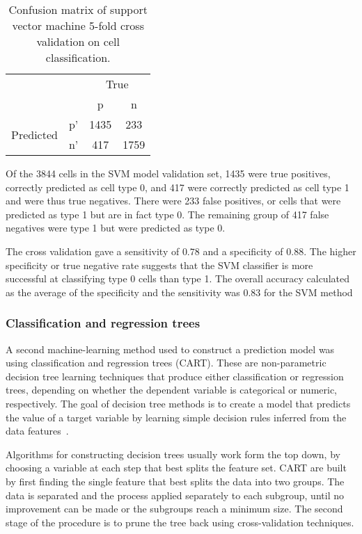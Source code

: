 \begin{table}[htbp]
\caption[Confusion matrix of SVM cross validation on cell classification]{Confusion matrix of support vector machine 5-fold cross validation on cell classification.}
\label{table:endothelial_morphometry:svm_confusion_matrix}
\centering
\begin{tabular}{cc|cc}
	\multicolumn{2}{c}{}&\multicolumn{2}{c}{True}\\
	\multicolumn{2}{c|}{}& p & n\\
	\cline{2-4}
	\multirow{2}{*}{Predicted}& p' & 1435 & 233\\ & n' & 417 & 1759\\
\end{tabular}
\end{table}

Of the 3844 cells in the SVM model validation set, 1435 were true positives, correctly predicted as cell type 0, and 417 were correctly predicted as cell type 1 and were thus true negatives. There were 233 false positives, or cells that were predicted as type 1 but are in fact type 0. The remaining group of 417 false negatives were type 1 but were predicted as type 0.

The cross validation gave a sensitivity of $0.78$ and a specificity of $0.88$. The higher specificity or true negative rate suggests that the SVM classifier is more successful at classifying type 0 cells than type 1. The overall accuracy calculated as the average of the specificity and the sensitivity was $0.83$ for the SVM method

\subsubsection{Classification and regression trees}
A second machine-learning method used to construct a prediction model was using classification and regression trees (CART). These are non-parametric decision tree learning techniques that produce either classification or regression trees, depending on whether the dependent variable is categorical or numeric, respectively. The goal of decision tree methods is to create a model that predicts the value of a target variable by learning simple decision rules inferred from the data features~\cite{Breiman1984}.

Algorithms for constructing decision trees usually work form the top down, by choosing a variable at each step that best splits the feature set. CART are built by first finding the single feature that best splits the data into two groups. The data is separated and the process applied separately to each subgroup, until no improvement can be made or the subgroups reach a minimum size. The second stage of the procedure is to prune the tree back using cross-validation techniques.

